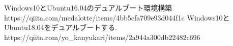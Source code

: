\documentclass[11pt,a4paper]{jsarticle}
\begin{document}
%


\begin{thebibliography}{99}
 Windows10とUbuntu16.04のデュアルブート環境構築\\https://qiita.com/medalotte/items/4bb5cfa709e93d044f1c
 Windows10とUbuntu18.04をデュアルブートする.\\https://qiita.com/yo\_kanyukari/items/2a944a300db22482c696
\end{thebibliography}%
%
\end{document}
